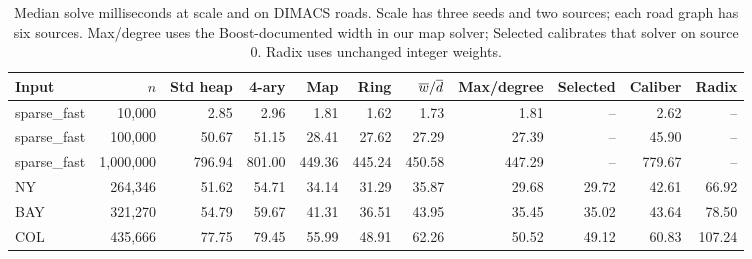 \begin{table}[tb]\centering\scriptsize\setlength{\tabcolsep}{2.5pt}
\caption{Median solve milliseconds at scale and on DIMACS roads. Scale has three seeds and two sources; each road graph has six sources. Max/degree uses the Boost-documented width in our map solver; Selected calibrates that solver on source 0. Radix uses unchanged integer weights.}
\begin{tabular}{lrrrrrrrrrr}
\toprule
Input & $n$ & Std heap & 4-ary & Map & Ring & $\overline{w}/\overline{d}$ & Max/degree & Selected & Caliber & Radix \\ \midrule
sparse\_fast & 10,000 & 2.85 & 2.96 & 1.81 & 1.62 & 1.73 & 1.81 & -- & 2.62 & -- \\
sparse\_fast & 100,000 & 50.67 & 51.15 & 28.41 & 27.62 & 27.29 & 27.39 & -- & 45.90 & -- \\
sparse\_fast & 1,000,000 & 796.94 & 801.00 & 449.36 & 445.24 & 450.58 & 447.29 & -- & 779.67 & -- \\
NY & 264,346 & 51.62 & 54.71 & 34.14 & 31.29 & 35.87 & 29.68 & 29.72 & 42.61 & 66.92 \\
BAY & 321,270 & 54.79 & 59.67 & 41.31 & 36.51 & 43.95 & 35.45 & 35.02 & 43.64 & 78.50 \\
COL & 435,666 & 77.75 & 79.45 & 55.99 & 48.91 & 62.26 & 50.52 & 49.12 & 60.83 & 107.24 \\
\bottomrule\end{tabular}\end{table}
